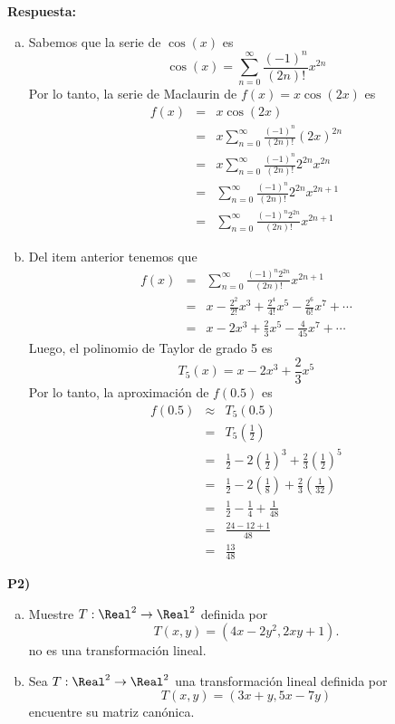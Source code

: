 \documentclass{article}
\begin{document}
\vspace{5mm}
\noindent\textbf{Respuesta:}
\begin{enumerate}[a)]
  \item Sabemos que la serie de $\cos(x)$ es
    $$\cos(x)=\sum_{n=0}^\infty \frac{(-1)^n}{(2n)!}x^{2n}$$
    Por lo tanto, la serie de Maclaurin de $f(x)=x\cos(2x)$ es
    \begin{eqnarray*}
      f(x) &=& x\cos(2x)\\
      &=& x\sum_{n=0}^\infty \frac{(-1)^n}{(2n)!}(2x)^{2n}\\
      &=& x\sum_{n=0}^\infty \frac{(-1)^n}{(2n)!}2^{2n}x^{2n}\\
      &=& \sum_{n=0}^\infty \frac{(-1)^n}{(2n)!}2^{2n}x^{2n+1}\\
      &=& \sum_{n=0}^\infty \frac{(-1)^n2^{2n}}{(2n)!}x^{2n+1}
    \end{eqnarray*}
  \item Del item anterior tenemos que
  \begin{eqnarray*}
    f(x) &=& \sum_{n=0}^\infty \frac{(-1)^n2^{2n}}{(2n)!}x^{2n+1}\\
    &=& x-\frac{2^2}{2!}x^3+\frac{2^4}{4!}x^5-\frac{2^6}{6!}x^7+\cdots\\
    &=& x-2x^3+\frac{2}{3}x^5-\frac{4}{45}x^7+\cdots
  \end{eqnarray*}
  Luego, el polinomio de Taylor de grado 5 es
  $$T_5(x) = x-2x^3+\frac{2}{3}x^5$$
  Por lo tanto, la aproximación de $f(0.5)$ es
  \begin{eqnarray*}
    f(0.5) &\approx& T_5(0.5)\\
    &=& T_5\left(\frac{1}{2}\right)\\
    &=& \frac{1}{2}-2\left(\frac{1}{2}\right)^3+\frac{2}{3}\left(\frac{1}{2}\right)^5\\
    &=& \frac{1}{2}-2\left(\frac{1}{8}\right)+\frac{2}{3}\left(\frac{1}{32}\right)\\
    &=& \frac{1}{2}-\frac{1}{4}+\frac{1}{48}\\
    &=& \frac{24-12+1}{48}\\
    &=& \frac{13}{48}
  \end{eqnarray*}
\end{enumerate}


\newpage
\noindent\textbf{P2) } 
\begin{enumerate}[a)]
  \item Muestre $T:\Real^2\to\Real^2$ definida por
    $$T(x,y)=(4x-2y^2,2xy+1).$$
    no es una transformación lineal.
  \item Sea $T:\Real^2\to\Real^2$ una transformación lineal definida por
    $$T(x,y)=(3x+y,5x-7y)$$
    encuentre su matriz canónica.
\end{enumerate}
\end{document}
